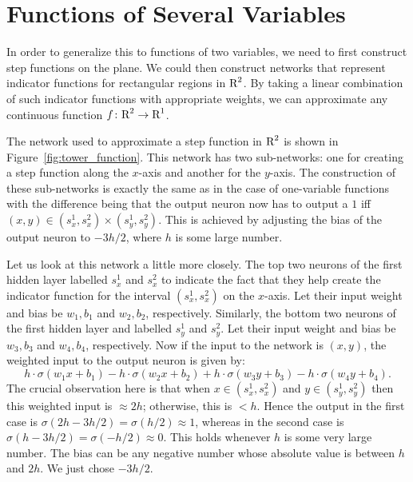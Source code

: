 \section{Functions of Several Variables}

In order to generalize this to functions of two variables, we need to first 
construct step functions on the plane. We could then construct networks 
that represent indicator functions for rectangular regions in $\text{R}^2$. By taking a 
linear combination of such indicator functions with appropriate weights, we can 
approximate any continuous function $f \colon \text{R}^2 \to \text{R}^1$. 

The network used to approximate a step function in $\text{R}^2$ is shown in 
Figure~\ref{fig:tower_function}. This network has two sub-networks: one 
for creating a step function along the $x$-axis and another for the $y$-axis. 
The construction of these sub-networks is exactly the same as in the case of 
one-variable functions with the difference being that the output neuron now has to 
output a $1$ iff $(x, y) \in (s_x^1, s_x^2) \times (s_y^1, s_y^2)$. This is achieved 
by adjusting the bias of the output neuron to $- 3h/2$, where $h$ is some large number.
  
Let us look at this network a little more closely. 
The top two neurons of the first hidden layer labelled $s_x^1$ and $s_x^2$ to indicate 
the fact that they help create the indicator function for the interval $(s_x^1, s_x^2)$ 
on the $x$-axis. Let their input weight and bias be $w_1, b_1$ and $w_2, b_2$, respectively. 
Similarly, the bottom two neurons of the first hidden layer and labelled $s_y^1$ and $s_y^2$.
Let their input weight and bias be $w_3, b_3$ and $w_4, b_4$, respectively. Now if the input 
to the network is $(x, y)$, the weighted input to the output neuron is given by:
\[
    h \cdot \sigma (w_1 x + b_1) - h \cdot \sigma (w_2 x + b_2) + h \cdot \sigma (w_3 y + b_3) 
    -h \cdot \sigma (w_4 y + b_4).
\]
The crucial observation here is that when $x \in (s_x^1, s_x^2)$ and $y \in (s_y^1, s_y^2)$ 
then this weighted input is $\approx 2h$; otherwise, this is $< h$. Hence the output in the 
first case is $\sigma (2h - 3h/2) = \sigma (h / 2) \approx 1$, whereas in the second case
is $\sigma (h - 3h/2) = \sigma (-h/2) \approx 0$. This holds whenever $h$ is some very large number.
The bias can be any negative number whose absolute value is between $h$ and $2h$. 
We just chose $-3h/2$.

